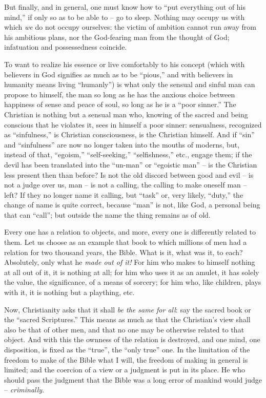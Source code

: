 But finally, and in general, one must know how to ``put everything out of his 
mind,'' if only so as to be able to -- go to sleep. Nothing may occupy us 
with which \textit{we} do not occupy ourselves: the victim of ambition cannot 
run away from his ambitious plans, nor the God-fearing man from the thought of 
God; infatuation and possessedness coincide.

To want to realize his essence or live comfortably to his concept (which with 
believers in God signifies as much as to be ``pious,'' and with believers in 
humanity means living ``humanly'') is what only the sensual and sinful man 
can propose to himself, the man so long as he has the anxious choice between 
happiness of sense and peace of soul, so long as he is a ``poor sinner.'' 
The Christian is nothing but a sensual man who, knowing of the sacred and 
being conscious that he violates it, sees in himself a poor sinner: 
sensualness, recognized as ``sinfulness,'' is Christian consciousness, is 
the Christian himself. And if ``sin'' and ``sinfulness'' are now no longer 
taken into the mouths of moderns, but, instead of that, ``egoism,'' 
``self-seeking,'' ``selfishness,'' etc., engage them; if the devil has 
been translated into the ``un-man'' or ``egoistic man'' -- is the 
Christian less present then than before? Is not the old discord between good 
and evil -- is not a judge over us, man -- is not a calling, the calling to 
make oneself man -- left? If they no longer name it calling, but ``task'' 
or, very likely, ``duty,'' the change of name is quite correct, because 
``man'' is not, like God, a personal being that can ``call''; but outside 
the name the thing remains as of old.

\myhrule


Every one has a relation to objects, and more, every one is differently 
related to them. Let us choose as an example that book to which millions of 
men had a relation for two thousand years, the Bible. What is it, what was it, 
to each? Absolutely, only what he \textit{made out of it!} For him who makes 
to himself nothing at all out of it, it is nothing at all; for him who uses it 
as an amulet, it has solely the value, the significance, of a means of 
sorcery; for him who, like children, plays with it, it is nothing but a 
plaything, etc.

Now, Christianity asks that it shall \textit{be the same for all}: say the 
sacred book or the ``sacred Scriptures.'' This means as much as that the 
Christian's view shall also be that of other men, and that no one may be 
otherwise related to that object. And with this the ownness of the relation is 
destroyed, and one mind, one disposition, is fixed as the ``true'', the 
``only true'' one. In the limitation of the freedom to make of the Bible 
what I will, the freedom of making in general is limited; and the coercion of 
a view or a judgment is put in its place. He who should pass the judgment that 
the Bible was a long error of mankind would judge -- \textit{criminally}.

